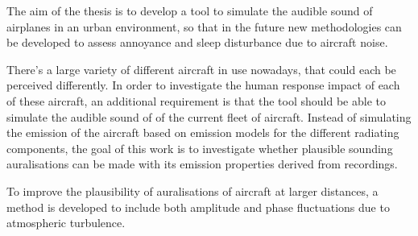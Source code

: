 
The aim of the thesis is to develop a tool to simulate the audible sound of
airplanes in an urban environment, so that in the future new methodologies can be
developed to assess annoyance and sleep disturbance due to aircraft noise.

There's a large variety of different aircraft in use nowadays, that could each
be perceived differently. In order to investigate the human response impact of
each of these aircraft, an additional requirement is that the tool should be
able to simulate the audible sound of of the current fleet of aircraft. Instead
of simulating the emission of the aircraft based on emission models for the
different radiating components, the goal of this work is to investigate whether
plausible sounding auralisations can be made with its emission properties
derived from recordings.

To improve the plausibility of auralisations of aircraft at larger distances, a
method is developed to include both amplitude and phase fluctuations due to
atmospheric turbulence.


%
%
%

